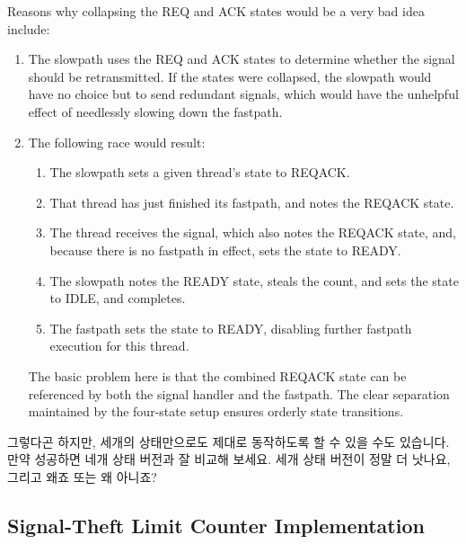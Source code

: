 {	Reasons why collapsing the REQ and ACK states would be a very
	bad idea include:
	\begin{enumerate}
	\item	The slowpath uses the REQ and ACK states to determine
		whether the signal should be retransmitted.
		If the states were collapsed, the slowpath would have
		no choice but to send redundant signals, which would
		have the unhelpful effect of needlessly slowing down
		the fastpath.
	\item	The following race would result:
		\begin{enumerate}
		\item	The slowpath sets a given thread's state to REQACK.
		\item	That thread has just finished its fastpath, and
			notes the REQACK state.
		\item	The thread receives the signal, which also notes
			the REQACK state, and, because there is no fastpath
			in effect, sets the state to READY.
		\item	The slowpath notes the READY state, steals the
			count, and sets the state to IDLE, and completes.
		\item	The fastpath sets the state to READY, disabling
			further fastpath execution for this thread.
		\end{enumerate}
		The basic problem here is that the combined REQACK state
		can be referenced by both the signal handler and the
		fastpath.
		The clear separation maintained by the four-state
		setup ensures orderly state transitions.
	\end{enumerate}
	\fi
	그렇다곤 하지만, 세개의 상태만으로도 제대로 동작하도록 할 수 있을 수도
	있습니다.
	만약 성공하면 네개 상태 버전과 잘 비교해 보세요.
	세개 상태 버전이 정말 더 낫나요, 그리고 왜죠 또는 왜 아니죠?

} \QuickQuizEnd

\subsection{Signal-Theft Limit Counter Implementation}
\label{sec:count:Signal-Theft Limit Counter Implementation}

